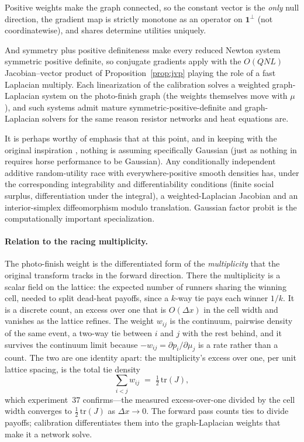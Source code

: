 \documentclass[12pt]{article}
\theoremstyle{remark}
\begin{document}
Positive weights make the graph
connected, so the constant vector is the \emph{only} null direction, the
gradient map is strictly monotone as an operator on $\mathbf{1}^\perp$
(not coordinatewise), and shares determine utilities uniquely.

And symmetry plus positive definiteness make every
reduced Newton system symmetric positive definite, so conjugate gradients apply with the $O(QNL)$
Jacobian--vector product of Proposition~\ref{prop:jvp} playing the role of
a fast Laplacian multiply. Each linearization of the calibration solves a weighted
graph-Laplacian system on the photo-finish graph (the weights themselves
move with $\mu$), and such systems admit mature symmetric-positive-definite and
graph-Laplacian solvers for the same reason resistor
networks and heat equations are.

It is perhaps worthy of emphasis that at this point, and in keeping with the 
original inspiration \citep{cotton2021}, 
nothing is assuming specifically Gaussian (just as nothing in \citet{cotton2021} requires
horse performance to be Gaussian). Any conditionally independent additive random-utility race with
everywhere-positive smooth densities has, under the corresponding
integrability and differentiability conditions (finite social surplus,
differentiation under the integral), a weighted-Laplacian Jacobian and an
interior-simplex diffeomorphism modulo translation. Gaussian factor
probit is the computationally important specialization.

\paragraph{Relation to the racing multiplicity.} The photo-finish weight
is the differentiated form of the \emph{multiplicity} that the original
transform \citep{cotton2021} tracks in the forward direction. There the
multiplicity is a scalar field on the lattice: the expected number of
runners sharing the winning cell, needed to split dead-heat payoffs,
since a $k$-way tie pays each winner $1/k$. It is a discrete count, an
excess over one that is $O(\Delta x)$ in the cell width and vanishes as
the lattice refines. The weight $w_{ij}$ is the continuum, pairwise
density of the same event, a two-way tie between $i$ and $j$ with the
rest behind, and it survives the continuum limit because
$-w_{ij} = \partial p_i/\partial\mu_j$ is a rate rather than a count. The
two are one identity apart: the multiplicity's excess over one, per unit
lattice spacing, is the total tie density
\[
\sum_{i<j} w_{ij} \;=\; \tfrac12\,\mathrm{tr}(J),
\]
which experiment~37 confirms---the measured excess-over-one divided by
the cell width converges to $\tfrac12\,\mathrm{tr}(J)$ as
$\Delta x \to 0$. The forward pass counts ties to divide payoffs;
calibration differentiates them into the graph-Laplacian weights that
make it a network solve.
\end{document}
